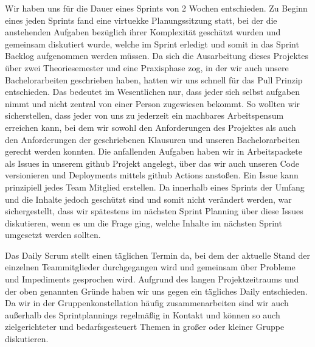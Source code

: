 Wir haben uns für die Dauer eines Sprints von 2 Wochen entschieden. Zu Beginn eines jeden Sprints fand eine virtuekke Planungssitzung statt, bei der die anstehenden Aufgaben bezüglich ihrer Komplexität geschätzt wurden und gemeinsam diskutiert wurde, welche im Sprint erledigt und somit in das Sprint Backlog aufgenommen werden müssen. Da sich die Ausarbeitung dieses Projektes über zwei Theoriesemester und eine Praxisphase zog, in der wir auch unsere Bachelorarbeiten geschrieben haben, hatten wir uns schnell für das Pull Prinzip entschieden. Das bedeutet im Wesentlichen nur, dass jeder sich selbst aufgaben nimmt und nicht zentral von einer Person zugewiesen bekommt. So wollten wir sicherstellen, dass jeder von uns zu jederzeit ein machbares Arbeitspensum erreichen kann, bei dem wir sowohl den Anforderungen des Projektes als auch den Anforderungen der geschriebenen Klausuren und unseren Bachelorarbeiten gerecht werden konnten. Die anfallenden Aufgaben haben wir in Arbeitspackete als Issues in unserem github Projekt angelegt, über das wir auch unseren Code versionieren und Deployments mittels github Actions anstoßen. Ein Issue kann prinzipiell jedes Team Mitglied erstellen. Da innerhalb eines Sprints der Umfang und die Inhalte jedoch geschützt sind und somit nicht verändert werden, war sichergestellt, dass wir spätestens im nächsten Sprint Planning über diese Issues diskutieren, wenn es um die Frage ging, welche Inhalte im nächsten Sprint umgesetzt werden sollten. 

 Das Daily Scrum stellt einen täglichen Termin da, bei dem der aktuelle Stand der einzelnen Teammitglieder durchgegangen wird und gemeinsam über Probleme und Impediments gesprochen wird. Aufgrund des langen Projektzeitraums und der oben genannten Gründe haben wir uns gegen ein tägliches Daily entschieden. Da wir in der Gruppenkonstellation häufig zusammenarbeiten sind wir auch außerhalb des Sprintplannings regelmäßig in Kontakt und können so auch zielgerichteter und bedarfsgesteuert Themen in großer oder kleiner Gruppe diskutieren. 
 
